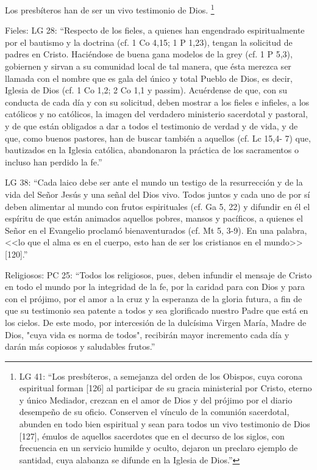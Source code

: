 \documentclass[12pt]{article}
\begin{document}
{Los presbíteros han de ser un vivo testimonio de Dios.
\footnote{
LG 41: 
``Los presbíteros, a semejanza del orden de los Obispos, cuya corona espiritual forman [126] al participar de su gracia ministerial por Cristo, eterno y único Mediador, crezcan en el amor de Dios y del prójimo por el diario desempeño de su oficio. Conserven el vínculo de la comunión sacerdotal, abunden en todo bien espiritual y sean para todos un vivo testimonio de Dios [127], émulos de aquellos sacerdotes que en el decurso de los siglos, con frecuencia en un servicio humilde y oculto, dejaron un preclaro ejemplo de santidad, cuya alabanza se difunde en la Iglesia de Dios.''
}

Fieles:
LG 28:  
``Respecto de los fieles, a quienes han engendrado espiritualmente por el bautismo y la doctrina (cf. 1 Co 4,15; 1 P 1,23), tengan la solicitud de padres en Cristo. Haciéndose de buena gana modelos de la grey (cf.  1 P 5,3), gobiernen y sirvan a su comunidad local de tal manera, que ésta merezca ser llamada con el nombre que es gala del único y total Pueblo de Dios, es decir, Iglesia de Dios (cf. 1 Co 1,2; 2 Co 1,1 y passim). Acuérdense de que, con su conducta de cada día y con su solicitud, deben mostrar a los fieles e infieles, a los católicos y no católicos, la imagen del verdadero ministerio sacerdotal y pastoral, y de que están obligados a dar a todos el testimonio de verdad y de vida, y de que, como buenos pastores, han de buscar también a aquellos (cf. Lc 15,4- 7) que, bautizados en la Iglesia católica, abandonaron la práctica de los sacramentos o incluso han perdido la fe.''

LG 38:
``Cada laico debe ser ante el mundo un testigo de la resurrección y de la vida del Señor Jesús y una señal del Dios vivo. Todos juntos y cada uno de por sí deben alimentar al mundo con frutos espirituales (cf. Ga 5, 22) y difundir en él el espíritu de que están animados aquellos pobres, mansos y pacíficos, a quienes el Señor en el Evangelio proclamó bienaventurados (cf. Mt 5, 3-9). En una palabra, <<lo que el alma es en el cuerpo, esto han de ser los cristianos en el mundo>> [120].''

Religiosos:
PC 25:
``Todos los religiosos, pues, deben infundir el mensaje de Cristo en todo el mundo por la integridad de la fe, por la caridad para con Dios y para con el prójimo, por el amor a la cruz y la esperanza de la gloria futura, a fin de que su testimonio sea patente a todos y sea glorificado nuestro Padre que está en los cielos. De este modo, por intercesión de la dulcísima Virgen María, Madre de Dios, "cuya vida es norma de todos", recibirán mayor incremento cada día y darán más copiosos y saludables frutos.''

}
\end{document}
